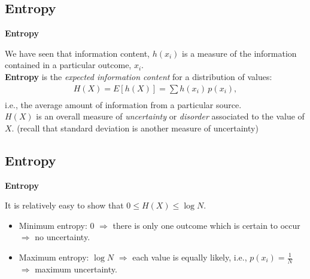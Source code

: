 \documentclass[compress]{beamer}        %
\makeatletter
\newcommand{\tcb}{\textcolor{beamer@blendedblue}}
\makeatother
\begin{document}
\subsection{Entropy}
\begin{frame}{\bf \tcb{Entropy}}

We have seen that information content, $h(x_i)$ is a measure of the information contained in a particular outcome, $x_i$.\\[0.8cm]

{\bf Entropy} is the \emph{expected information content} for a distribution of values:\\[-0.2cm]
\begin{align*}
\boxed{H(X) = E[h(X)] = \sum h(x_i) \, p(x_i)},\\[-0.2cm]
\end{align*}
i.e., the average amount of information from a particular source.\\[0.8cm]

$H(X)$ is an overall measure of \emph{uncertainty} or \emph{disorder} associated to the value of $X$. {\footnotesize(recall that standard deviation is another measure of uncertainty)}



\end{frame}



\subsection{Entropy}
\begin{frame}{\bf \tcb{Entropy}}

It is relatively easy to show that $\boxed{0 \le H(X) \le \log N}$.\\[0.8cm]

\begin{itemize}\itemsep0.8cm
\item Minimum entropy: $0$ $\Rightarrow$ there is only one outcome which is certain to occur $\Rightarrow$ no uncertainty.
\item Maximum entropy: $\log N$ $\Rightarrow$ each value is equally likely, i.e., $p(x_i) = \frac{1}{N}$ $\Rightarrow$ maximum uncertainty.
\end{itemize}


\end{frame}
\end{document}
